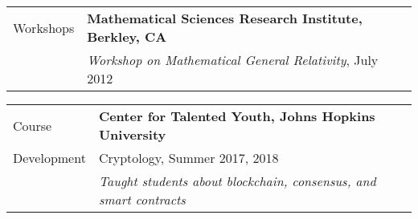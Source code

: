\documentclass[letterpaper,10pt,oneside]{article}
\begin{document}
\vfill


\newpage

\noindent \begin{tabular}{@{} l l}
 \Large{Workshops} & \textbf{Mathematical Sciences Research Institute, Berkley, CA} \\
 \hspace{1.1in} & \emph{Workshop on Mathematical General Relativity}, July 2012 \\
\end{tabular}

\vfill

\noindent \begin{tabular}{@{} l l}
 \Large{Course} & \textbf{Center for Talented Youth, Johns Hopkins University} \\
 \Large{Development} & Cryptology, Summer 2017, 2018 \\
 \hspace{1.1in} & \emph{Taught students about blockchain, consensus, and smart contracts} \\
\end{tabular}

\vfill
\end{document}
